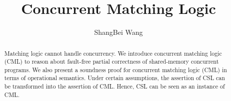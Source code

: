 \documentclass{lmcs} %
\theoremstyle{plain}\newtheorem{satz}[thm]{Satz} %
\begin{document}
\title[]{Concurrent Matching Logic}

\author[S.~Wang]{ShangBei Wang}	%
\address{Nanjing University of Aeronautics and Astronautics, Nanjing, China}	%







\begin{abstract}
Matching logic cannot handle concurrency. We introduce concurrent matching logic (CML) to reason about fault-free
partial correctness of shared-memory concurrent programs. We also present a soundness proof for concurrent matching logic (CML) in terms of operational semantics. Under
certain assumptions, the assertion of CSL can be transformed into the assertion of CML. Hence, CSL can be seen as an
instance of CML.
\end{abstract}

\maketitle

\end{document}
